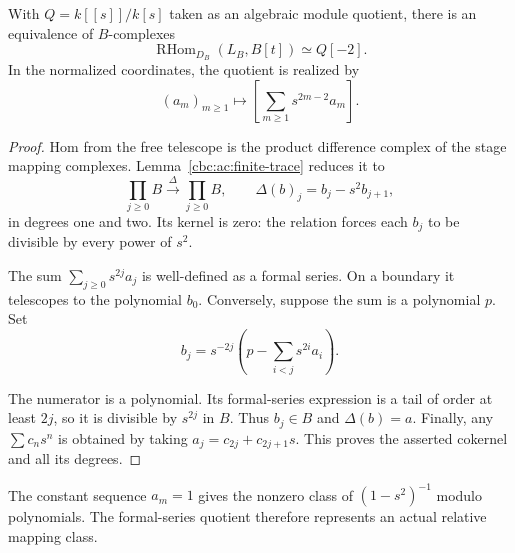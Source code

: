 \begin{theorem}\label{cbc:ac:relative-dual}
With $Q=k[[s]]/k[s]$ taken as an algebraic module
quotient, there is an equivalence of $B$-complexes
\[
 \operatorname{RHom}_{D_B}(L_B,B[t])
                 \simeq Q[-2].
\]
In the normalized coordinates, the quotient is realized by
\[
 (a_m)_{m\geq1}\longmapsto
            \left[\sum_{m\geq1}s^{2m-2}a_m\right].
\]
\end{theorem}
\begin{proof}
Hom from the free telescope is the product difference
complex of the stage mapping complexes.
Lemma~\ref{cbc:ac:finite-trace} reduces it to
\[
 \prod_{j\geq0}B\xrightarrow{\Delta}\prod_{j\geq0}B,
 \qquad \Delta(b)_j=b_j-s^2b_{j+1},
\]
in degrees one and two. Its kernel is zero:
the relation forces each $b_j$ to be divisible
by every power of $s^2$.

The sum $\sum_{j\geq0}s^{2j}a_j$ is well-defined
as a formal series. On a boundary it telescopes
to the polynomial $b_0$. Conversely, suppose
the sum is a polynomial $p$. Set
\[
 b_j=s^{-2j}\left(p-\sum_{i<j}s^{2i}a_i\right).
\]

The numerator is a polynomial. Its formal-series
expression is a tail of order at least $2j$,
so it is divisible by $s^{2j}$ in $B$.
Thus $b_j\in B$ and $\Delta(b)=a$.
Finally, any $\sum c_n s^n$ is obtained by taking
$a_j=c_{2j}+c_{2j+1}s$.
This proves the asserted cokernel and all its degrees.
\end{proof}

The constant sequence $a_m=1$ gives the nonzero
class of $(1-s^2)^{-1}$ modulo polynomials.
The formal-series quotient therefore represents
an actual relative mapping class.


